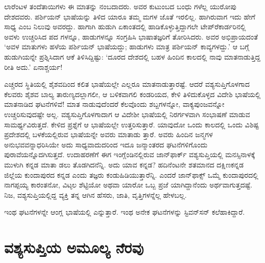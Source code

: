 ಲಾರೆಂಟಳ ತಂದೆತಾಯಿಗಳು ಈ ಮಾತನ್ನು ನಂಬದಾದರು. ಅವರ ಕುಟುಂಬದ ಬಂಧು ಗಳೆಲ್ಲ ಯುರೋಪು ದೇಶದವರು. ಪರ್ಶಿಯನ್ ಭಾಷೆಯನ್ನು ತಿಳಿದ ಯಾರೂ ತಮ್ಮ ಮಗಳ ಜೊತೆ ಇರಲಿಲ್ಲ. ಹಾಗಿರುವಾಗ ಇದು ಹೇಗೆ ಸಾಧ್ಯ ಎಂಬ ನಿಲುವು ಅವರದ್ದು. ಹಾಗಾಗಿ ಹುಡುಗಿ ಏಕಾಂತದಲ್ಲಿ ಹಾಡಿಕೊಳ್ಳುತ್ತಿದ್ದಾಗಲೇ ಟೇಪ್​ರೆಕಾರ್ಡರಿನಲ್ಲಿ ಅವಳು ಉಚ್ಚರಿಸಿದ ಪದ ಗಳನ್ನೂ, ಹಾಡುಗಳನ್ನೂ ಸಂಗ್ರಹಿಸಿ ಭಾಷಾತಜ್ಞರಿಗೆ ತೋರಿಸಿದರು. ಅವರ ಅಭಿಪ್ರಾಯದಂತೆ ‘ಅವಳ ಮಾತುಗಳು ಹಳೆಯ ಪರ್ಶಿಯನ್ ಭಾಷೆಯದ್ದು; ಹಾಡುಗಳು ಮಾತ್ರ ಪರ್ಶಿಯನ್ ಕಾವ್ಯಗಳದ್ದು.’ ಆ ಬಗ್ಗೆ ಹುಡುಗಿಯನ್ನೇ ಪ್ರಶ್ನಿಸಿದಾಗ ಆಕೆ ತಿಳಿಸಿದ್ದಿಷ್ಟು: ‘ದೂರದ ದೇಶದಲ್ಲಿ ಬಹಳ ಹಿಂದಿನ ಕಾಲದಲ್ಲಿ ನಾವು ಮಾತನಾಡುತ್ತಿದ್ದ ರೀತಿ ಅದು.’ ಏನಾಶ್ಚರ್ಯ!

ಎಚ್ಚರದ ಸ್ಥಿತಿಯಲ್ಲಿ ಶೈಶವದಿಂದ ಕಲಿತ ಭಾಷೆಯಲ್ಲೇ ಎಲ್ಲರೂ ಮಾತನಾಡುತ್ತಾರಷ್ಟೆ. ಆದರೆ ವಶ್ಯಸುಪ್ತಿಗೊಳಗಾದ ಕೆಲವರು ಶೈಶವ ಬಾಲ್ಯ ತಾರುಣ್ಯದಲ್ಲಾಗಲೀ, ಆ ಬಳಿಕವಾಗಲಿ ಕಂಡರಿಯದ, ಕೇಳಿ ತಿಳಿದುಕೊಳ್ಳದ ವಿದೇಶಿ ಭಾಷೆಯಲ್ಲಿ ಮಾತನಾಡಿದ ಘಟನೆಗಳಿವೆ! ಮಾತ ನಾಡುವುದೆಂದರೆ ಕೆಲವೊಂದು ಶಬ್ದಗಳನ್ನೋ, ವಾಕ್ಯಪುಂಜವನ್ನೋ ಉಚ್ಚರಿಸುವುದಷ್ಟೇ ಅಲ್ಲ. ವಶ್ಯಸುಪ್ತಿಗೊಳಗಾದಾಗ ಆ ವಿದೇಶೀ ಭಾಷೆಯಲ್ಲಿ ನಿರರ್ಗಳವಾಗಿ ಸಂಭಾಷಣೆ ಮಾಡುವ ಸಾಮರ್ಥ್ಯವಿರುತ್ತದೆ. ಕೇಳಿದ ಪ್ರಶ್ನೆಗೆ ಆ ಭಾಷೆಯಲ್ಲೇ ಉತ್ತರಿಸುತ್ತಾರೆ. ಯಾವುದೋ ಒಂದು ಕಾಲದಲ್ಲಿ ಒಂದು ವಿಶಿಷ್ಟ ಪ್ರದೇಶದಲ್ಲಿ ಬಳಕೆಯಲ್ಲಿರುವ ಭಾಷೆಯನ್ನೇ ಅವರು ಮಾತಾಡು ತ್ತಾರೆ. ಅವರು ಹಿಂದಿನ ಜನ್ಮಗಳ ಅನುಭವವನ್ನಾಧರಿಸಿಯೇ ಅದು ಸಾಧ್ಯವಾದುದರಿಂದ ಇದೂ ಜನ್ಮಾಂತರದ ಘಟನೆಗಳಿಗೊಂದು ಪುರಾವೆಯನ್ನೊದಗಿಸುತ್ತದೆ. ಉದಾಹರಣೆಗೆ ಈಗ ಇಂಗ್ಲೆಂಡಿನಲ್ಲಿರುವ ಜಾನ್​ಫಾರ್ಕ್ ವಶ್ಯಸುಪ್ತಿಯಲ್ಲಿ ಮನಸ್ಸಿನಾಳಕ್ಕೆ ಮುಳುಗಿ ಕನ್ನಡ ಮಾತಾ ಡಲು ತೊಡಗಿದನೆನ್ನಿ. ಅದು ಯಾವ ಕನ್ನಡ? ಹದಿನೆಂಟನೇ ಶತಮಾನದ ದಕ್ಷಿಣಕನ್ನಡ ಜಿಲ್ಲೆಯ ಕುಂದಾಪುರದ ಕನ್ನಡ ಎಂದು ತಜ್ಞರು ಕಂಡುಹಿಡಿಯುತ್ತಾರೆನ್ನಿ. ಎಂದರೆ ಜಾನ್​ಫಾಕ್ಸ್ ಒಮ್ಮೆ ಕುಂದಾಪುರದಲ್ಲಿ ನಾಗಪ್ಪಯ್ಯ ಕಾರಂತನೋ, ವಿಟ್ಠಲ ಶೆಟ್ಟಿಯೋ ಅಥವಾ ಯಾರೋ ಒಬ್ಬ ಪ್ರಜೆ ಯಾಗಿದ್ದಾನೆಂದು ಅರ್ಥವಾಗುತ್ತದಷ್ಟೆ. ನಿಜ, ವಶ್ಯಸುಪ್ತಿಯಲ್ಲಿದ್ದ ವ್ಯಕ್ತಿ ತನ್ನ ಆಗಿನ ಹೆಸರು, ಜಾತಿ, ವೃತ್ತಿಗಳನ್ನೆಲ್ಲ ಹೇಳಬಲ್ಲ.

ಇಂಥ ಘಟನೆಗಳನ್ನೇ ಆಂಗ್ಲ ಭಾಷೆಯಲ್ಲಿ  ಎನ್ನುತ್ತಾರೆ. ಇಂಥ ಅನೇಕ ಘಟನೆಗಳನ್ನು ಸ್ಟಿವನ್​ಸನ್ ಕಲೆಹಾಕಿದ್ದಾರೆ.


\section{ವಶ್ಯಸುಪ್ತಿಯ ಅಮೂಲ್ಯ ನೆರವು}

